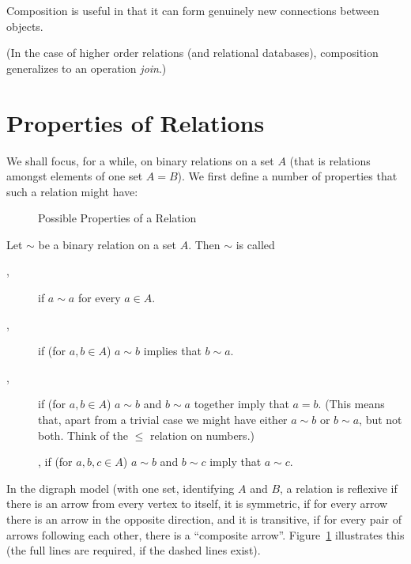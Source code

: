 Composition is useful in that it can form genuinely new connections between
objects. 

(In the case of higher order relations (and relational databases),
composition generalizes to an operation {\em join}.)

\section{Properties of Relations}

We shall focus, for a while, on binary relations on a set $A$ (that is
relations amongst elements of one set $A=B$). We first
define a number of
properties that such a relation might have:
\begin{figure}
\begin{center}
\end{center}
\caption{Possible Properties of a Relation}
\label{figreppropsdigraph}
\end{figure}
\begin{defn}
Let $\sim$ be a binary relation on a set $A$. Then $\sim$ is called
\begin{description}
\item[,] if $a\sim a$ for every $a\in A$.
\item[,] if (for $a,b\in A$) $a\sim b$ implies that $b\sim a$.
\item[,] if (for $a,b\in A$) $a\sim b$ and $b\sim a$ together
imply that $a=b$. (This means that, apart from a trivial case we might have either
$a\sim b$ or $b\sim a$, but not both. Think of the $\le$ relation on numbers.)
\item[], if (for $a,b,c\in A$) $a\sim b$ and $b\sim c$ imply that
$a\sim c$.
\end{description}
\end{defn}
In the digraph model (with one set, identifying $A$ and $B$, a relation is
reflexive if there is an arrow from every vertex to itself, it is symmetric,
if for every arrow there is an arrow in the opposite direction, and it is
transitive, if for every pair of arrows following each other, there is a
``composite arrow''. Figure~\ref{figreppropsdigraph} illustrates this (the full
lines are required, if the dashed lines exist).


